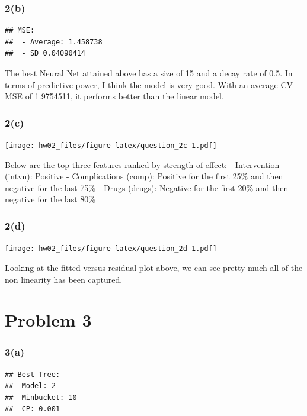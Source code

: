 \documentclass[
]{article}
\begin{document}
\hypertarget{b-1}{%
\subsubsection{2(b)}\label{b-1}}

\begin{verbatim}
## MSE: 
##  - Average: 1.458738 
##  - SD 0.04090414
\end{verbatim}

The best Neural Net attained above has a size of 15 and a decay rate of
0.5. In terms of predictive power, I think the model is very good. With
an average CV MSE of 1.9754511, it performs better than the linear
model.

\hypertarget{c-1}{%
\subsubsection{2(c)}\label{c-1}}

\texttt{[image: hw02\_files/figure-latex/question\_2c-1.pdf]}

Below are the top three features ranked by strength of effect: -
Intervention (intvn): Positive - Complications (comp): Positive for the
first 25\% and then negative for the last 75\% - Drugs (drugs): Negative
for the first 20\% and then negative for the last 80\%

\hypertarget{d}{%
\subsubsection{2(d)}\label{d}}

\texttt{[image: hw02\_files/figure-latex/question\_2d-1.pdf]}

Looking at the fitted versus residual plot above, we can see pretty much
all of the non linearity has been captured.

\hypertarget{problem-3}{%
\section{Problem 3}\label{problem-3}}

\hypertarget{a-2}{%
\subsubsection{3(a)}\label{a-2}}

\begin{verbatim}
## Best Tree: 
##  Model: 2 
##  Minbucket: 10 
##  CP: 0.001
\end{verbatim}
\end{document}
